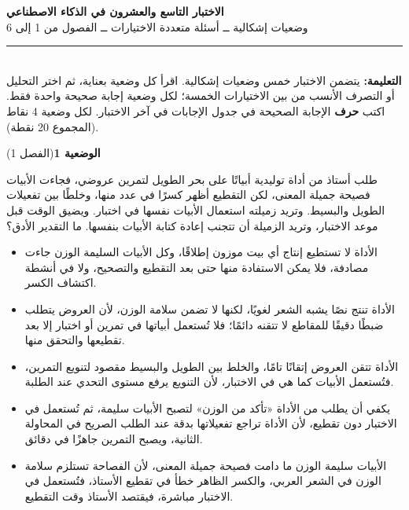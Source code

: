 \documentclass[11pt,a4paper]{article}
\begin{document}
\linespread{1.08}\selectfont
\begin{center}
{\LARGE\khatt\textbf{الاختبار التاسع والعشرون في الذكاء الاصطناعي}}\\[4pt]
{\normalsize وضعيات إشكالية ــ أسئلة متعددة الاختيارات ــ الفصول من 1 إلى 6}
\end{center}
\vspace{-2pt}\rule{\textwidth}{0.6pt}\\[2pt]
\textbf{التعليمة:} يتضمن الاختبار خمس وضعيات إشكالية. اقرأ كل وضعية بعناية، ثم اختر التحليل أو التصرف الأنسب
من بين الاختيارات الخمسة؛ لكل وضعية إجابة صحيحة واحدة فقط.
اكتب \textbf{حرف} الإجابة الصحيحة في جدول الإجابات في آخر الاختبار.
لكل وضعية 4 نقاط (المجموع 20 نقطة).
\vspace{4pt}

\noindent
{\large\khatt\textbf{الوضعية 1}}\hfill{\small(الفصل 1)}\par\nopagebreak\vspace{3pt}
\setlength{\fboxsep}{7pt}\colorbox{gray!10}{\parbox{\dimexpr\linewidth-14pt}{طلب أستاذ من أداة توليدية أبياتًا على بحر الطويل لتمرين عروضي، فجاءت الأبيات فصيحة جميلة المعنى، لكن التقطيع أظهر كسرًا في عدد منها، وخلطًا بين تفعيلات الطويل والبسيط. وتريد زميلته استعمال الأبيات نفسها في اختبار. ويضيق الوقت قبل موعد الاختبار، وتريد الزميلة أن تتجنب إعادة كتابة الأبيات بنفسها. ما التقدير الأدق؟}}\par\nopagebreak
\begin{itemize}[leftmargin=1.0cm, labelsep=6pt, itemsep=3pt, topsep=4pt, parsep=0pt]
  \item[\textbf{أ)}] الأداة لا تستطيع إنتاج أي بيت موزون إطلاقًا، وكل الأبيات السليمة الوزن جاءت مصادفة، فلا يمكن الاستفادة منها حتى بعد التقطيع والتصحيح، ولا في أنشطة اكتشاف الكسر.
  \item[\textbf{ب)}] الأداة تنتج نصًا يشبه الشعر لغويًا، لكنها لا تضمن سلامة الوزن، لأن العروض يتطلب ضبطًا دقيقًا للمقاطع لا تتقنه دائمًا؛ فلا تُستعمل أبياتها في تمرين أو اختبار إلا بعد تقطيعها والتحقق منها.
  \item[\textbf{ج)}] الأداة تتقن العروض إتقانًا تامًا، والخلط بين الطويل والبسيط مقصود لتنويع التمرين، فتُستعمل الأبيات كما هي في الاختبار، لأن التنويع يرفع مستوى التحدي عند الطلبة.
  \item[\textbf{د)}] يكفي أن يطلب من الأداة «تأكد من الوزن» لتصبح الأبيات سليمة، ثم تُستعمل في الاختبار دون تقطيع، لأن الأداة تراجع تفعيلاتها بدقة عند الطلب الصريح في المحاولة الثانية، ويصبح التمرين جاهزًا في دقائق.
  \item[\textbf{هـ)}] الأبيات سليمة الوزن ما دامت فصيحة جميلة المعنى، لأن الفصاحة تستلزم سلامة الوزن في الشعر العربي، والكسر الظاهر خطأ في تقطيع الأستاذ، فتُستعمل في الاختبار مباشرة، فيقتصد الأستاذ وقت التقطيع.
\end{itemize}
\end{document}

